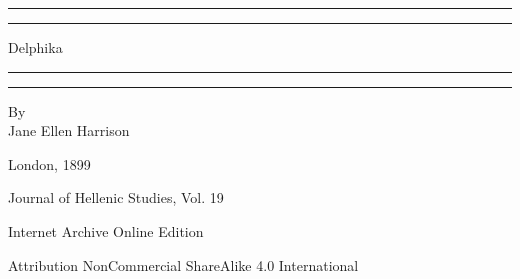 \documentclass[a4paper, 11pt, oneside, polutonikogreek, english]{article}
\begin{document}
\begin{titlepage} %
	\centering %
	\scshape %

	
	\rule{\textwidth}{1.6pt}\vspace*{-\baselineskip}\vspace*{2pt} %
	\rule{\textwidth}{0.4pt} %
	
	\vspace{0.75\baselineskip} %

        {\LARGE Delphika \\} %
	
	\vspace{0.75\baselineskip} %
	
	\rule{\textwidth}{0.4pt}\vspace*{-\baselineskip}\vspace{3.2pt} %
	\rule{\textwidth}{1.6pt} %
	
	\vspace{1\baselineskip} %
	
	
	{By \\\Large Jane Ellen Harrison\\} %
	
	\vspace*{1\baselineskip} %
	
	
	
	
		
	\vspace*{\fill}%
	
	
	{London, 1899} %
 
        {\small Journal of Hellenic Studies, Vol. 19}

	\vspace{1\baselineskip} %

        Internet Archive Online Edition  %
	
	{\small Attribution NonCommercial ShareAlike 4.0 International } %
\end{titlepage}
\clearpage
\setlength{\parskip}{1mm plus1mm minus1mm}
\tableofcontents
\clearpage
\end{document}
